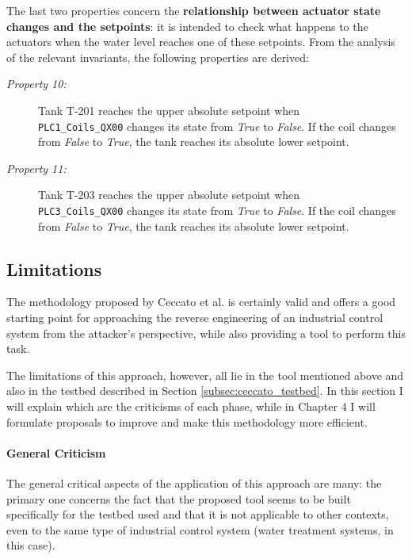 The last two properties concern the \textbf{relationship between actuator state changes and the setpoints}: it is intended to check what happens to the actuators when the water level reaches one of these setpoints. From the analysis of the relevant invariants, the following properties are derived:

\begin{description}
	\item[\colorbox{backcolourtext}{\normalfont\textit{Property 10:}}] Tank T-201 reaches the upper absolute setpoint when\\ \texttt{PLC1\_Coils\_QX00} changes its state from \textit{True} to \textit{False}. If the coil changes from \textit{False} to \textit{True}, the tank reaches its absolute lower setpoint.
	
	\item[\colorbox{backcolourtext}{\normalfont\textit{Property 11:}}]
	Tank T-203 reaches the upper absolute setpoint when\\ \texttt{PLC3\_Coils\_QX00} changes its state from \textit{True} to \textit{False}. If the coil changes from \textit{False} to \textit{True}, the tank reaches its absolute lower setpoint.	 
\end{description}

\subsection{Limitations}
\label{subsec:ceccato_limitations}
The methodology proposed by Ceccato et al. is certainly valid and offers a good starting point for approaching the reverse engineering of an industrial control system from the attacker's perspective, while also providing a tool to perform this task.

\bigskip
The limitations of this approach, however, all lie in the tool mentioned above and also in the testbed described in Section \ref{subsec:ceccato_testbed}. In this section I will explain which are the criticisms of each phase, while in Chapter 4 I will formulate proposals to improve and make this methodology more efficient.

\paragraph{General Criticism}
\label{par:limit_ceccato_general}
The general critical aspects of the application of this approach are many: the primary one concerns the fact that the proposed tool seems to be built specifically for the testbed used and that it is not applicable to other contexts, even to the same type of industrial control system (water treatment systems, in this case). 

